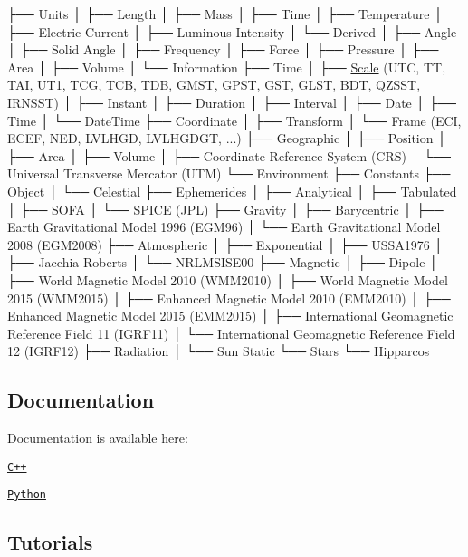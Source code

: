 \begin{DoxyCode}
├── Units
│   ├── Length
│   ├── Mass
│   ├── Time
│   ├── Temperature
│   ├── Electric Current
│   ├── Luminous Intensity
│   └── Derived
│       ├── Angle
│       ├── Solid Angle
│       ├── Frequency
│       ├── Force
│       ├── Pressure
│       ├── Area
│       ├── Volume
│       └── Information
├── Time
│   ├── \hyperlink{namespacelibrary_1_1physics_1_1time_a09d2bc9fbc7b0b5f92e1419bd655e6bb}{Scale} (UTC, TT, TAI, UT1, TCG, TCB, TDB, GMST, GPST, GST, GLST, BDT, QZSST, IRNSST)
│   ├── Instant
│   ├── Duration
│   ├── Interval
│   ├── Date
│   ├── Time
│   └── DateTime
├── Coordinate
│   ├── Transform
│   └── Frame (ECI, ECEF, NED, LVLHGD, LVLHGDGT, ...)
├── Geographic
│   ├── Position
│   ├── Area
│   ├── Volume
│   ├── Coordinate Reference System (CRS)
│   └── Universal Transverse Mercator (UTM)
└── Environment
    ├── Constants
    ├── Object
    │   └── Celestial
    ├── Ephemerides
    │   ├── Analytical
    │   ├── Tabulated
    │   ├── SOFA
    │   └── SPICE (JPL)
    ├── Gravity
    │   ├── Barycentric
    │   ├── Earth Gravitational Model 1996 (EGM96)
    │   └── Earth Gravitational Model 2008 (EGM2008)
    ├── Atmospheric
    │   ├── Exponential
    │   ├── USSA1976
    │   ├── Jacchia Roberts
    │   └── NRLMSISE00
    ├── Magnetic
    │   ├── Dipole
    │   ├── World Magnetic Model 2010 (WMM2010)
    │   ├── World Magnetic Model 2015 (WMM2015)
    │   ├── Enhanced Magnetic Model 2010 (EMM2010)
    │   ├── Enhanced Magnetic Model 2015 (EMM2015)
    │   ├── International Geomagnetic Reference Field 11 (IGRF11)
    │   └── International Geomagnetic Reference Field 12 (IGRF12)
    ├── Radiation
    │   └── Sun Static
    └── Stars
        └── Hipparcos
\end{DoxyCode}


\subsection*{Documentation}

Documentation is available here\+:


\begin{DoxyItemize}
\item \href{https://open-space-collective.github.io/library-physics}{\tt C++}
\item \href{./bindings/python/docs}{\tt Python}
\end{DoxyItemize}

\subsection*{Tutorials}


